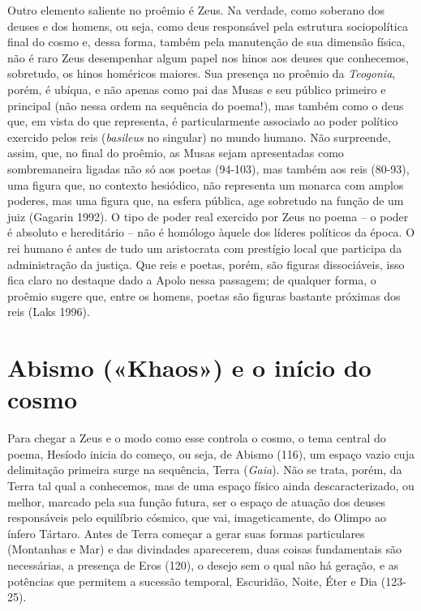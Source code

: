 Outro elemento saliente no proêmio é Zeus. Na verdade, como soberano dos
deuses e dos homens, ou seja, como deus responsável pela estrutura
sociopolítica final do cosmo e, dessa forma, também pela manutenção de
sua dimensão física, não é raro Zeus desempenhar algum papel nos hinos
aos deuses que conhecemos, sobretudo, os hinos homéricos maiores. Sua
presença no proêmio da \emph{Teogonia}, porém, é ubíqua, e não apenas
como pai das Musas e seu público primeiro e principal (não nessa ordem
na sequência do poema!), mas também como o deus que, em vista do que
representa, é particularmente associado ao poder político exercido pelos
reis (\emph{basileus} no singular) no mundo humano. Não surpreende,
assim, que, no final do proêmio, as Musas sejam apresentadas como
sombremaneira ligadas não só aos poetas (94-103), mas também aos reis
(80-93), uma figura que, no contexto hesiódico, não representa um
monarca com amplos poderes, mas uma figura que, na esfera pública, age
sobretudo na função de um juiz (Gagarin 1992). O tipo de poder real
exercido por Zeus no poema -- o poder é absoluto e hereditário -- não é
homólogo àquele dos líderes políticos da época. O rei humano é antes de
tudo um aristocrata com prestígio local que participa da administração
da justiça. Que reis e poetas, porém, são figuras dissociáveis, isso
fica claro no destaque dado a Apolo nessa passagem; de qualquer forma, o
proêmio sugere que, entre os homens, poetas são figuras bastante
próximas dos reis (Laks 1996).

\section{Abismo («Khaos») e o início do cosmo}

Para chegar a Zeus e o modo como esse controla o cosmo, o tema central
do poema, Hesíodo inicia do começo, ou seja, de Abismo (116), um espaço
vazio cuja delimitação primeira surge na sequência, Terra (\emph{Gaia}).
Não se trata, porém, da Terra tal qual a conhecemos, mas de uma espaço
físico ainda descaracterizado, ou melhor, marcado pela sua função
futura, ser o espaço de atuação dos deuses responsáveis pelo equilíbrio
cósmico, que vai, imageticamente, do Olimpo ao ínfero Tártaro. Antes de
Terra começar a gerar suas formas particulares (Montanhas e Mar) e das
divindades aparecerem, duas coisas fundamentais são necessárias, a
presença de Eros (120), o desejo sem o qual não há geração, e as
potências que permitem a sucessão temporal, Escuridão, Noite, Éter e Dia
(123-25).

